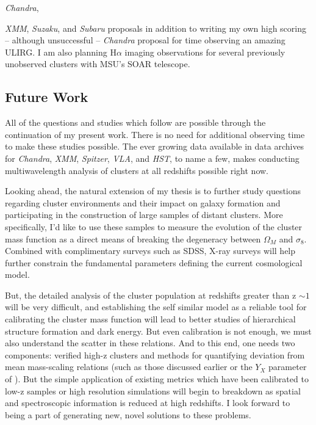 \documentclass[11pt]{article}
\begin{document}
{\textit{Chandra}}, {\textit{XMM}, {\textit{Suzaku}}, and
{\textit{Subaru}} proposals in addition to writing my own high
scoring -- although unsuccessful -- {\textit{Chandra}} proposal for time
observing an amazing ULIRG. I am also planning H$\alpha$ imaging
observations for several previously unobserved clusters with MSU's
SOAR telescope.

\subsection*{Future Work}

All of the questions and studies which follow are possible through
the continuation of my present work. There is no need for additional
observing time to make these studies possible. The ever growing data
available in data archives for {\textit{Chandra}}, {\textit{XMM}},
{\textit{Spitzer}}, {\textit{VLA}}, and {\textit{HST}}, to name a few,
makes conducting multiwavelength analysis of clusters at all redshifts
possible right now. 

Looking ahead, the natural extension of my thesis is to further study
questions regarding cluster environments and their impact on galaxy
formation and participating in the construction of large samples of
distant clusters. More specifically, I'd like to use these samples to
measure the evolution of the cluster mass function as a direct means
of breaking the degeneracy between $\Omega_M$ and $\sigma_8$. Combined
with complimentary surveys such as SDSS, X-ray surveys will help further
constrain the fundamental parameters defining the current cosmological
model.

But, the detailed analysis of the cluster population at redshifts
greater than z $\sim 1$ will be very difficult, and establishing the
self similar model as a reliable tool for calibrating the cluster mass
function will lead to better studies of hierarchical structure
formation and dark energy. But even calibration is not enough, we must
also understand the scatter in these relations. And to this end, one
needs two components: verified high-z clusters and methods for
quantifying deviation from mean mass-scaling relations (such as those
discussed earlier or the $Y_X$ parameter of
\cite{2006ApJ...650..128K}). But the simple application of existing
metrics which have been calibrated to low-z samples or high
resolution simulations will begin to breakdown as spatial and
spectroscopic information is reduced at high redshifts. I look forward
to being a part of generating new, novel solutions to these problems.

}
\end{document}
